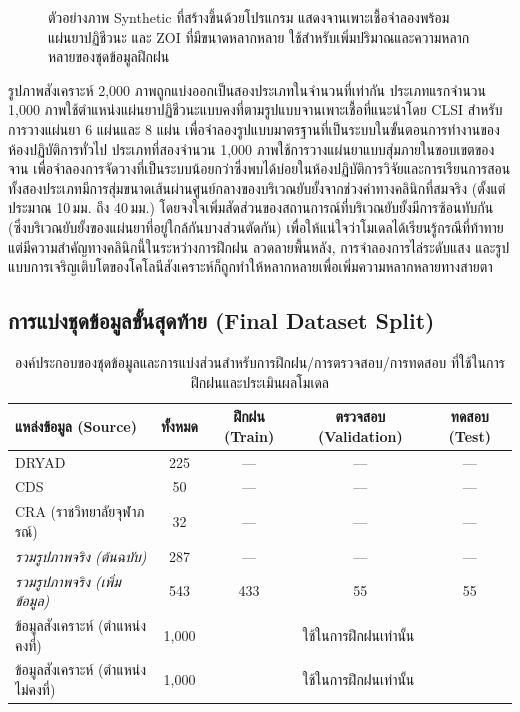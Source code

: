 \begin{figure}[H]
  \centering
  \caption{ตัวอย่างภาพ Synthetic ที่สร้างขึ้นด้วยโปรแกรม แสดงจานเพาะเชื้อจำลองพร้อมแผ่นยาปฏิชีวนะ
    และ ZOI ที่มีขนาดหลากหลาย ใช้สำหรับเพิ่มปริมาณและความหลากหลายของชุดข้อมูลฝึกฝน}
  \label{fig:synthetic_example}
\end{figure}

รูปภาพสังเคราะห์ 2,000 ภาพถูกแบ่งออกเป็นสองประเภทในจำนวนที่เท่ากัน ประเภทแรกจำนวน 1,000 ภาพใช้ตำแหน่งแผ่นยาปฏิชีวนะแบบคงที่ตามรูปแบบจานเพาะเชื้อที่แนะนำโดย CLSI สำหรับการวางแผ่นยา 6 แผ่นและ 8 แผ่น เพื่อจำลองรูปแบบมาตรฐานที่เป็นระบบในขั้นตอนการทำงานของห้องปฏิบัติการทั่วไป ประเภทที่สองจำนวน 1,000 ภาพใช้การวางแผ่นยาแบบสุ่มภายในขอบเขตของจาน เพื่อจำลองการจัดวางที่เป็นระบบน้อยกว่าซึ่งพบได้บ่อยในห้องปฏิบัติการวิจัยและการเรียนการสอน ทั้งสองประเภทมีการสุ่มขนาดเส้นผ่านศูนย์กลางของบริเวณยับยั้งจากช่วงค่าทางคลินิกที่สมจริง (ตั้งแต่ประมาณ 10\,มม. ถึง 40\,มม.) โดยจงใจเพิ่มสัดส่วนของสถานการณ์ที่บริเวณยับยั้งมีการซ้อนทับกัน (ซึ่งบริเวณยับยั้งของแผ่นยาที่อยู่ใกล้กันบางส่วนตัดกัน) เพื่อให้แน่ใจว่าโมเดลได้เรียนรู้กรณีที่ท้าทายแต่มีความสำคัญทางคลินิกนี้ในระหว่างการฝึกฝน ลวดลายพื้นหลัง, การจำลองการไล่ระดับแสง และรูปแบบการเจริญเติบโตของโคโลนีสังเคราะห์ก็ถูกทำให้หลากหลายเพื่อเพิ่มความหลากหลายทางสายตา

\subsection{การแบ่งชุดข้อมูลขั้นสุดท้าย (Final Dataset Split)}

\begin{table}[H]
  \centering
  \caption{องค์ประกอบของชุดข้อมูลและการแบ่งส่วนสำหรับการฝึกฝน/การตรวจสอบ/การทดสอบ ที่ใช้ในการฝึกฝนและประเมินผลโมเดล}
  \label{tab:dataset_split}
  \begin{tabular}{lcccc}
    \toprule
    \textbf{แหล่งข้อมูล (Source)} & \textbf{ทั้งหมด} & \textbf{ฝึกฝน (Train)} & \textbf{ตรวจสอบ (Validation)} & \textbf{ทดสอบ (Test)} \\
    \midrule
    DRYAD                              & 225   & ---   & ---   & ---   \\
    CDS                                & 50    & ---   & ---   & ---   \\
    CRA (ราชวิทยาลัยจุฬาภรณ์)           & 32    & ---   & ---   & ---   \\
    \textit{รวมรูปภาพจริง (ต้นฉบับ)}     & 287   & ---   & ---   & ---   \\
    \textit{รวมรูปภาพจริง (เพิ่มข้อมูล)}  & 543   & 433   & 55    & 55    \\
    ข้อมูลสังเคราะห์ (ตำแหน่งคงที่)       & 1,000 & \multicolumn{3}{c}{ใช้ในการฝึกฝนเท่านั้น} \\
    ข้อมูลสังเคราะห์ (ตำแหน่งไม่คงที่)     & 1,000 & \multicolumn{3}{c}{ใช้ในการฝึกฝนเท่านั้น} \\
    \bottomrule
  \end{tabular}
\end{table}

